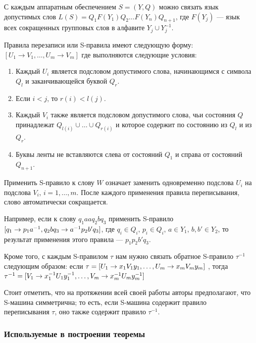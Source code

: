 \documentclass[14pt]{matmex-diploma-custom}
\begin{document}
С каждым аппаратным обеспечением $ S = (Y, Q) $ можно связать язык допустимых слов
$ L (S) = Q_1F(Y_1) Q_2 \dots F (Y_n) Q_{n + 1} $, где $ F (Y_j) $ --- язык
всех сокращенных групповых слов в алфавите $ Y_j \cup Y_j^{-1} $.

Правила перезаписи или S-правила имеют следующую форму:
$ [U_1 \to V_1, \dots, U_m \to V_m] $
где выполняются следующие условия:
\begin{enumerate}
    \item Каждый $ U_i $ является подсловом допустимого слова, начинающимся с символа $ Q_l $ и заканчивающейся буквой $ Q_r $.
    \item Если $i < j$, то $r(i) < l(j)$.
    \item Каждый $ V_i $ также является подсловом допустимого слова, чьи состояния $Q$ 
    принадлежат $ Q_{l(i)} \cup \dots \cup Q_{r(i)} $ и которое содержит по состоянию из $Q_l$ и из $Q_r$.
    \item Буквы ленты не вставляются слева от состояний $ Q_1 $ и справа от состояний $ Q_{n + 1} $.
\end{enumerate}

Применить S-правило к слову $ W $ означает заменить одновременно
подслова $ U_i $ на подслова $ V_i $, $ i = 1, \dots, m $. 
После каждого применения правила переписывания, слово автоматически сокращается.

Например, если к слову $ q_1 a a q_2 b q_3 $ применить S-правило
$\newline
[q_1 \to p_1 a^{-1}, q_2 b q_3 \to a^{-1} p_2 b' q_3]$,
где $q_i \in Q_i$, $p_i \in Q_i$, $a \in Y_1$, $b, b' \in Y_2$, то результат
применения этого правила --- $ p_1 p_2 b' q_3 $.

Кроме того, с каждым S-правилом $ \tau $ нам нужно связать обратное 
S-правило $ \tau^{-1} $ следующим образом:
если
$\\ \tau = [U_1 \to x_1 V_1 y_1, \dots, U_m \to x_m V_m y_m]$
, тогда
$\\ \tau^{-1} = [V_1 \to x_1^{-1} U_1 y_1^{-1}, \dots, V_m \to x_m^{-1} U_m y_m^{-1}]$

Стоит отметить, что на протяжении всей своей работы авторы предполагают, что
S-машина симметрична; то есть, если S-машина содержит
правило переписывания $ \tau $, оно также содержит правило $ \tau^{-1} $.

\subsubsection{Используемые в построении теоремы}
\end{document}
